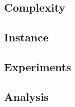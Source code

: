 
\subsection{Complexity}


\subsection{Instance}


\subsection{Experiments}


\subsection{Analysis}

\newpage